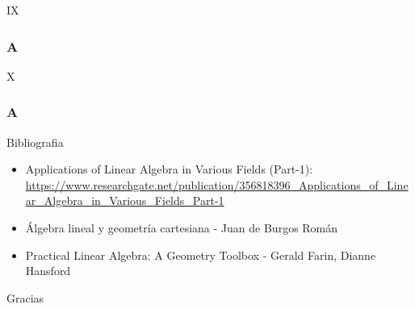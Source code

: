\documentclass[xcolor={dvipsnames},aspectratio=169,10pt]{beamer}
\begin{document}
\begin{frame}[fragile]{IX}
    \frametitle{A}
    \lipsum[1-1]
\end{frame}

\begin{frame}[fragile]{X}
    \frametitle{A}
    \lipsum[1-1]
\end{frame}

\begin{frame}{Bibliografia}
  \begin{itemize}
    \item Applications of Linear Algebra in Various Fields (Part-1): \url{https://www.researchgate.net/publication/356818396_Applications_of_Linear_Algebra_in_Various_Fields_Part-1}
    \item Álgebra lineal y geometría cartesiana - Juan de Burgos Román
    \item Practical Linear Algebra: A Geometry Toolbox - Gerald Farin, Dianne Hansford
  \end{itemize}
\end{frame}

\begin{frame}[standout]
  Gracias \\
\end{frame}
\end{document}
